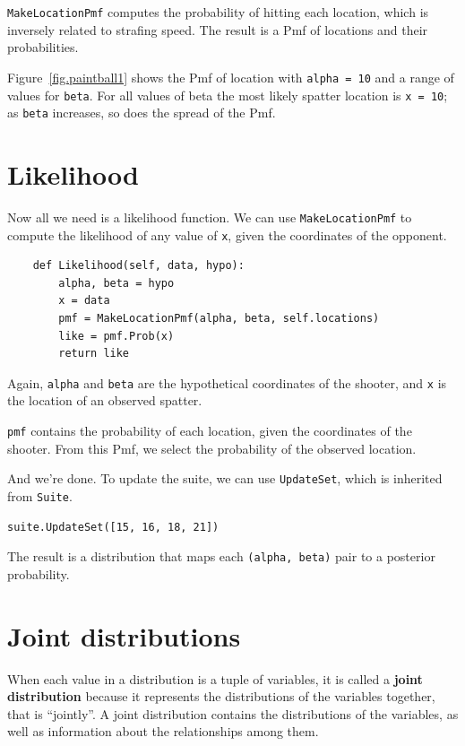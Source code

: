 \documentclass[12pt]{book}
\begin{document}
{\tt MakeLocationPmf} computes the probability of hitting
each location, which is inversely related to
strafing speed.  The result is a Pmf of locations and their
probabilities.

Figure~\ref{fig.paintball1} shows the Pmf of location with {\tt alpha
  = 10} and a range of values for {\tt beta}.  For all values of beta
the most likely spatter location is {\tt x = 10}; as {\tt beta}
increases, so does the spread of the Pmf.



\section{Likelihood}

Now all we need is a likelihood function.
We can use {\tt MakeLocationPmf} to compute the likelihood
of any value of {\tt x}, given the coordinates of the opponent.

\begin{verbatim}
    def Likelihood(self, data, hypo):
        alpha, beta = hypo
        x = data
        pmf = MakeLocationPmf(alpha, beta, self.locations)
        like = pmf.Prob(x)
        return like
\end{verbatim}

Again, {\tt alpha} and {\tt beta} are the hypothetical coordinates of
the shooter, and {\tt x} is the location of an observed spatter.

{\tt pmf} contains the probability of each location, given the
coordinates of the shooter.  From this Pmf, we select the probability
of the observed location.

And we're done.  To update the suite, we can use {\tt UpdateSet},
which is inherited from {\tt Suite}.

\begin{verbatim}
suite.UpdateSet([15, 16, 18, 21])
\end{verbatim}

The result is a distribution that maps each {\tt (alpha, beta)} pair
to a posterior probability.


\section{Joint distributions}

When each value in a distribution is a tuple of variables, it is
called a {\bf joint distribution} because it represents the
distributions of the variables together, that is ``jointly''.
A joint distribution contains the distributions of the variables,
as well as information about the relationships among them.
\end{document}

